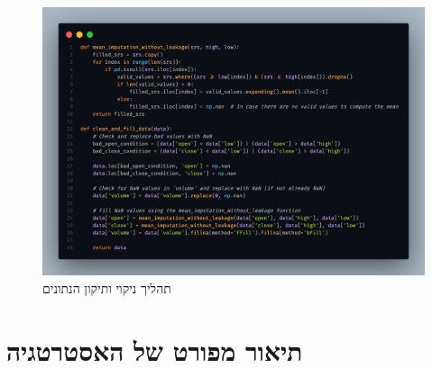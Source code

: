 \documentclass[a4paper,11pt]{article}
\begin{document}
\begin{RTL}
\begin{figure}[H]
    \centering
    \includegraphics[width=.8\textwidth]{Data_cleaning.png}
    \caption{תהליך ניקוי ותיקון הנתונים}
\end{figure}

\section{תיאור מפורט של האסטרטגיה}



\end{RTL}
\end{document}
